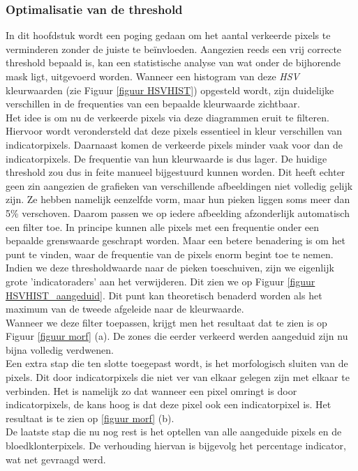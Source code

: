 \documentclass[a4paper,kulak]{kulakarticle}
\begin{document}
\subsubsection{Optimalisatie van de threshold} \label{additional_filter}
In dit hoofdstuk wordt een poging gedaan om het aantal verkeerde pixels te verminderen zonder de juiste te beïnvloeden. Aangezien reeds een vrij correcte threshold bepaald is, kan een statistische analyse van wat onder de bijhorende mask ligt, uitgevoerd worden. Wanneer een histogram van deze \textit{HSV} kleurwaarden (zie Figuur \ref{figuur HSVHIST}) opgesteld wordt, zijn duidelijke verschillen in de frequenties van een bepaalde kleurwaarde zichtbaar.\\
Het idee is om nu de verkeerde pixels via deze diagrammen eruit te filteren. Hiervoor wordt verondersteld dat deze pixels essentieel in kleur verschillen van indicatorpixels. Daarnaast komen de verkeerde pixels minder vaak voor dan de indicatorpixels. De frequentie van hun kleurwaarde is dus lager. De huidige threshold zou dus in feite manueel bijgestuurd kunnen worden. Dit heeft echter geen zin aangezien de grafieken van verschillende afbeeldingen niet volledig gelijk zijn. Ze hebben namelijk eenzelfde vorm, maar hun pieken liggen soms meer dan 5\% verschoven. Daarom passen we op iedere afbeelding afzonderlijk automatisch een filter toe. In principe kunnen alle pixels met een frequentie onder een bepaalde grenswaarde geschrapt worden. Maar een betere benadering is om het punt te vinden, waar de frequentie van de pixels enorm begint toe te nemen. Indien we deze thresholdwaarde naar de pieken toeschuiven, zijn we eigenlijk grote 'indicatoraders' aan het verwijderen. Dit zien we op Figuur \ref{figuur HSVHIST_aangeduid}. Dit punt kan theoretisch benaderd worden als het maximum van de tweede afgeleide naar de kleurwaarde. \\
Wanneer we deze filter toepassen, krijgt men het resultaat dat te zien is op Figuur \ref{figuur morf} (a). De zones die eerder verkeerd werden aangeduid zijn nu bijna volledig verdwenen.\\
Een extra stap die ten slotte toegepast wordt, is het morfologisch sluiten van de pixels. Dit door indicatorpixels die niet ver van elkaar gelegen zijn met elkaar te verbinden. Het is namelijk zo dat wanneer een pixel omringt is door indicatorpixels, de kans hoog is dat deze pixel ook een indicatorpixel is. Het resultaat is te zien op \ref{figuur morf} (b).\\
De laatste stap die nu nog rest is het optellen van alle aangeduide pixels en de bloedklonterpixels. De verhouding hiervan is bijgevolg het percentage indicator, wat net gevraagd werd.
\end{document}
